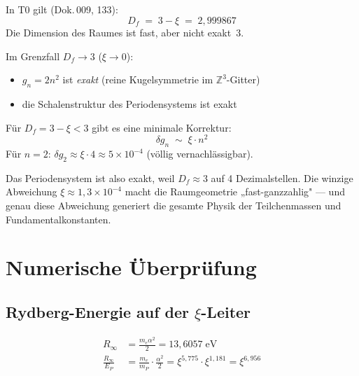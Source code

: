 In T0 gilt (Dok.\,009, 133):
\begin{equation}
  D_f \;=\; 3 - \xi \;=\; 2{,}999867
\end{equation}
Die Dimension des Raumes ist fast, aber nicht exakt~3.

Im Grenzfall $D_f \to 3$ ($\xi \to 0$):
\begin{itemize}
  \item $g_n = 2n^2$ ist \emph{exakt} (reine Kugelsymmetrie im $\mathbb{Z}^3$-Gitter)
  \item die Schalenstruktur des Periodensystems ist exakt
\end{itemize}

Für $D_f = 3 - \xi < 3$ gibt es eine minimale Korrektur:
\begin{equation}
  \delta g_n \;\sim\; \xi \cdot n^2
\end{equation}
Für $n = 2$: $\delta g_2 \approx \xi \cdot 4 \approx 5 \times 10^{-4}$
(völlig vernachlässigbar).

Das Periodensystem ist also exakt, weil $D_f \approx 3$ auf 4 Dezimalstellen.
Die winzige Abweichung $\xi \approx 1{,}3 \times 10^{-4}$ macht die Raumgeometrie
„fast-ganzzahlig" — und genau diese Abweichung generiert die gesamte
Physik der Teilchenmassen und Fundamentalkonstanten.

\section{Numerische Überprüfung}
\label{sec:numerik}

\subsection{Rydberg-Energie auf der \texorpdfstring{$\xi$}{xi}-Leiter}

\begin{align}
  R_\infty &= \frac{m_e \alpha^2}{2} = 13{,}6057\;\text{eV} \\
  \frac{R_\infty}{E_P} &= \frac{m_e}{m_P} \cdot \frac{\alpha^2}{2}
    = \xi^{5{,}775} \cdot \xi^{1{,}181}
    = \xi^{6{,}956}
\end{align}

\begin{table}[htbp]
\centering
\caption{Rydberg-Energie: T0-Ableitung vs. Messung}
\label{tab:rydberg}
\end{table}

